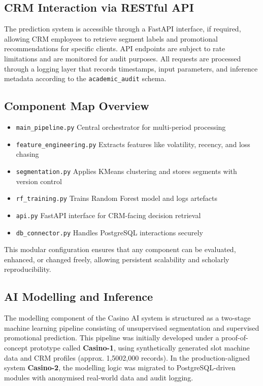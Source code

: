 \documentclass[12pt,a4paper]{report}
\begin{document}
\subsection{CRM Interaction via RESTful API}

The prediction system is accessible through a FastAPI interface, if required, allowing CRM employees to retrieve segment labels and promotional recommendations for specific clients.  API endpoints are subject to rate limitations and are monitored for audit purposes.  All requests are processed through a logging layer that records timestamps, input parameters, and inference metadata according to the  \texttt{academic\_audit} schema.

\subsection{Component Map Overview}

\begin{itemize}
    \item \texttt{main\_pipeline.py} \textendash{} Central orchestrator for multi-period processing
    \item \texttt{feature\_engineering.py} \textendash{} Extracts features like volatility, recency, and loss chasing
    \item \texttt{segmentation.py} \textendash{} Applies KMeans clustering and stores segments with version control
    \item \texttt{rf\_training.py} \textendash{} Trains Random Forest model and logs artefacts
    \item \texttt{api.py} \textendash{} FastAPI interface for CRM-facing decision retrieval
    \item \texttt{db\_connector.py} \textendash{} Handles PostgreSQL interactions securely
\end{itemize}

This modular configuration ensures that any component can be evaluated, enhanced, or changed freely, allowing persistent scalability and scholarly reproducibility.


\subsection{AI Modelling and Inference}
\label{sec:ai_modelling_inference}

The modelling component of the Casino AI system is structured as a two-stage machine learning pipeline consisting of unsupervised segmentation and supervised promotional prediction. This pipeline was initially developed under a proof-of-concept prototype called \textbf{Casino-1}, using synthetically generated slot machine data and CRM profiles (approx. 1,5002,000 records). In the production-aligned system \textbf{Casino-2}, the modelling logic was migrated to PostgreSQL-driven modules with anonymised real-world data and audit logging.
\end{document}
